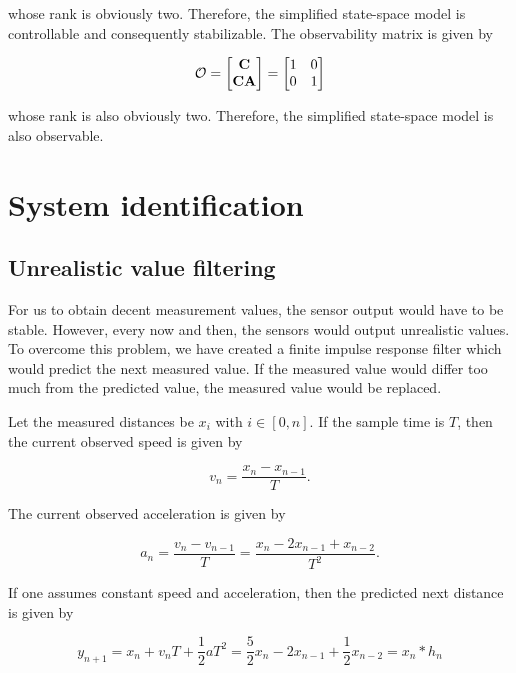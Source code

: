 \documentclass[11pt,titlepage]{report}
\begin{document}
whose rank is obviously two. Therefore, the simplified state-space model is controllable and consequently stabilizable. The observability matrix is given by

\begin{equation}
	\mathcal{O} = \begin{bmatrix}
		\mathbf{C} \\
		\mathbf{C} \mathbf{A}
	\end{bmatrix} = \begin{bmatrix}
		1 & 0 \\
		0 & 1
	\end{bmatrix}
\end{equation}

whose rank is also obviously two. Therefore, the simplified state-space model is also observable.

\section{System identification}
\subsection{Unrealistic value filtering}
For us to obtain decent measurement values, the sensor output would have to be stable. However, every now and then, the sensors would output unrealistic values. To overcome this problem, we have created a finite impulse response filter which would predict the next measured value. If the measured value would differ too much from the predicted value, the measured value would be replaced.

Let the measured distances be $x_i$ with $i \in [0,n]$. If the sample time is $T$, then the current observed speed is given by

\begin{equation}
	v_n = \frac{x_{n} - x_{n-1}}{T}.
\end{equation}

The current observed acceleration is given by

\begin{equation}
	a_n = \frac{v_n - v_{n-1}}{T} = \frac{x_{n} - 2 x_{n-1} + x_{n-2}}{T^2}.
\end{equation}

If one assumes constant speed and acceleration, then the predicted next distance is given by

\begin{equation}
	y_{n+1} = x_{n} + v_n T + \frac{1}{2} a T^2 = \frac{5}{2} x_n - 2 x_{n-1} + \frac{1}{2} x_{n-2}= x_n \ast h_n
\end{equation}
\end{document}
